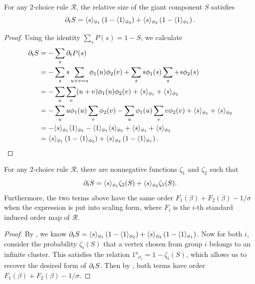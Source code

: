 \documentclass[twoside,10pt]{article}
\begin{document}
\begin{lem}
        \label{2c-sdelS}
        For any 2-choice rule $\mathcal{R}$, the relative size of the giant component $S$ satisfies
	\[
		\partial_{t}{S} = \langle s \rangle_{\phi_1}\left( 1-\langle 1 \rangle_{\phi_2} \right) + \langle s \rangle_{\phi_2}\left( 1-\langle 1 \rangle_{\phi_1} \right).
	\] 
\end{lem}
\begin{proof}
        Using the identity $\sum_s P(s) = 1-S$, we calculate
        \begin{align*}
                \partial_{t}{S} &= - \sum_s \partial_{t}{P(s)} \\
                          &= - \sum_s s \sum_{u+v=s}\phi_1(u)\phi_2(v) + \sum_s s \phi_1(s) \sum_s + s \phi_2(s) \\
                          &= - \sum_u \sum_v (u+v) \phi_1(u)\phi_2(v) + \langle s \rangle_{\phi_1} + \langle s \rangle_{\phi_2} \\
                          &= -\sum_{u}u \phi_1(u) \sum_{v} \phi_2(v) - \sum_{u}\phi_1(u)\sum_{v}v \phi_2(v) + \langle s \rangle_{\phi_1} + \langle s \rangle_{\phi_2} \\
                          &= -\langle s \rangle_{\phi_1}\langle 1 \rangle_{\phi_2} - \langle 1 \rangle_{\phi_1}\langle s \rangle_{\phi_2} + \langle s \rangle_{\phi_1}+\langle s \rangle_{\phi_2} \\
                          &= \langle s \rangle_{\phi_1}\left( 1-\langle 1 \rangle_{\phi_2} \right) + \langle s \rangle_{\phi_2}\left( 1-\langle 1 \rangle_{\phi_1} \right).
        \end{align*}
\end{proof}

\begin{thrm}
	\label{2c-same-order}
	For any 2-choice rule $\mathcal{R}$, there are nonnegative functions $\zeta_1$ and $\zeta_2$ such that
	\[
		\partial_{t}{S} = \langle s \rangle_{\phi_1}\zeta_2(S) + \langle s \rangle_{\phi_2}\zeta_1(S).
	\] 
	Furthermore, the two terms above have the same order $F_1(\beta) + F_2(\beta) - 1/\sigma$ when the expression is put into scaling form, where $F_{i}$ is the $i$-th standard induced order map of $\mathcal{R}$.
\end{thrm}
\begin{proof}
	By , we know $\partial_{t}{S} = \langle s \rangle_{\phi_1}\left( 1-\langle 1 \rangle_{\phi_2} \right) + \langle s \rangle_{\phi_2}\left( 1-\langle 1 \rangle_{\phi_1} \right)$. Now for both $i$, consider the probability $\zeta_i(S)$ that a vertex chosen from group $i$ belongs to an infinite cluster. This satisfies the relation $\ang{1}_{\phi_i} = 1-\zeta_i(S)$, which allows us to recover the desired form of $\partial_{t}{S} $. Then by , both terms have order $F_1(\beta) + F_2(\beta) - 1/\sigma$.
\end{proof}
\end{document}
